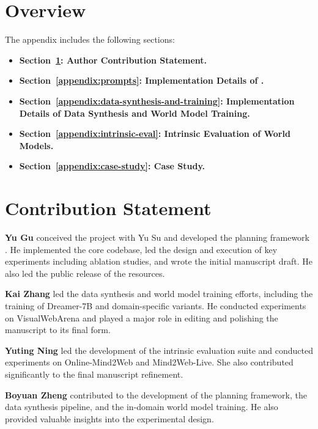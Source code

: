 


\renewcommand{\thefigure}{\thesection.\arabic{figure}}
\renewcommand{\thetable}{\thesection.\arabic{table}}


\section*{Overview}

The appendix includes the following sections:
\begin{itemize}
    \item \textbf{Section~\ref{appendix:contribution-statement}: Author Contribution Statement.}
    \item \textbf{Section~\ref{appendix:prompts}: Implementation Details of \OurMethod.}
    \item \textbf{Section~\ref{appendix:data-synthesis-and-training}: Implementation Details of Data Synthesis and World Model Training.}
    \item \textbf{Section~\ref{appendix:intrinsic-eval}: Intrinsic Evaluation of World Models.} 
    \item \textbf{Section~\ref{appendix:case-study}: Case Study.}
\end{itemize}

\section{Contribution Statement}
\label{appendix:contribution-statement}
\textbf{Yu Gu} conceived the project with Yu Su and developed the planning framework \OurMethod.
He implemented the core codebase, led the design and execution of key experiments including ablation studies, and wrote the initial manuscript draft.
He also led the public release of the resources.

\textbf{Kai Zhang} led the data synthesis and world model training efforts, including the training of Dreamer-7B and domain-specific variants.
He conducted experiments on VisualWebArena and played a major role in editing and polishing the manuscript to its final form.

\textbf{Yuting Ning} led the development of the intrinsic evaluation suite and conducted experiments on Online-Mind2Web and Mind2Web-Live.
She also contributed significantly to the final manuscript refinement.

\textbf{Boyuan Zheng} contributed to the development of the planning framework, the data synthesis pipeline, and the in-domain world model training. He also provided valuable insights into the experimental design.


